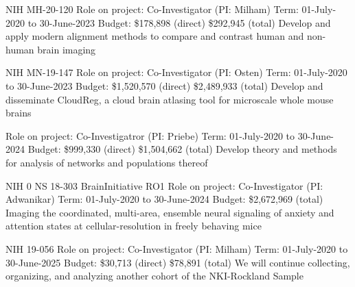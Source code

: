 \documentclass[10pt,colorlinks=true,urlcolor=blue]{moderncv}
\begin{document}
{\newline NIH MH-20-120
\newline Role on project: Co-Investigator (PI: Milham)
\newline Term: 01-July-2020 to 30-June-2023
\newline Budget: \$178,898 (direct) \$292,945 (total)
\newline Develop and apply modern alignment methods to compare and contrast human and non-
human brain imaging}{}{}{}{}

{\newline NIH MN-19-147
\newline Role on project: Co-Investigator (PI: Osten)
\newline Term: 01-July-2020 to 30-June-2023
\newline Budget: \$1,520,570 (direct) \$2,489,933 (total)
\newline Develop and disseminate CloudReg, a cloud brain atlasing tool for microscale whole
mouse brains}{}{}{}{}

{\newline Role on project: Co-Investigatror (PI: Priebe)
\newline Term: 01-July-2020 to 30-June-2024
\newline Budget: \$999,330 (direct) \$1,504,662 (total)
\newline Develop theory and methods for analysis of networks and populations thereof}{}{}{}{}

{\newline NIH 0 NS 18-303 BrainInitiative RO1
\newline Role on project: Co-Investigator (PI: Adwanikar)
\newline Term: 01-July-2020 to 30-June-2024
\newline Budget: \$2,672,969 (total)
\newline Imaging the coordinated, multi-area, ensemble neural signaling of anxiety and attention
states at cellular-resolution in freely behaving mice}{}{}{}{}

{\newline NIH 19-056
\newline Role on project: Co-Investigator (PI: Milham)
\newline Term: 01-July-2020 to 30-June-2025
\newline Budget: \$30,713 (direct) \$78,891 (total)
\newline We will continue collecting, organizing, and analyzing another cohort of the NKI-Rockland
Sample}{}{}{}{}
\end{document}

